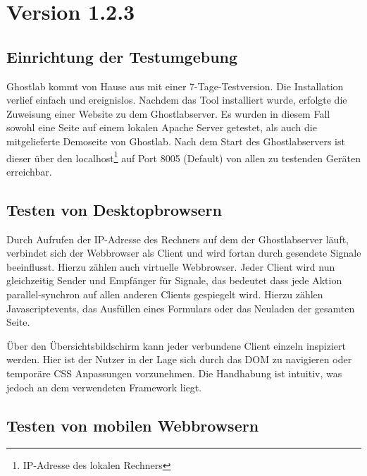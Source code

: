 	\section{ Version 1.2.3}
		\subsection {Einrichtung der Testumgebung}
		Ghostlab kommt von Hause aus mit einer 7-Tage-Testversion. Die Installation verlief einfach und ereignislos. Nachdem das Tool installiert wurde, erfolgte die Zuweisung einer Website zu dem Ghostlabserver. Es wurden in diesem Fall sowohl eine Seite auf einem lokalen \Gls{Apache} Server getestet, als auch die mitgelieferte Demoseite von Ghostlab. Nach dem Start des Ghostlabservers ist dieser über den localhost\footnote{IP-Adresse des lokalen Rechners} auf Port 8005 (Default) von allen zu testenden Geräten erreichbar.
		
		\subsection{Testen von Desktopbrowsern}
		Durch Aufrufen der IP-Adresse des Rechners auf dem der Ghostlabserver läuft, verbindet sich der \Gls{Webbrowser} als Client und wird fortan durch gesendete Signale beeinflusst. Hierzu zählen auch virtuelle \Gls{Webbrowser}. Jeder Client wird nun gleichzeitig Sender und Empfänger für Signale, das bedeutet dass jede Aktion \Gls{parallel-synchron} auf allen anderen Clients gespiegelt wird. Hierzu zählen \Gls{Javascript}events, das Ausfüllen eines Formulars oder das Neuladen der gesamten Seite.
		
		Über den Übersichtsbildschirm kann jeder verbundene Client einzeln inspiziert werden. Hier ist der Nutzer in der Lage sich durch das \Gls{DOM} zu navigieren oder temporäre CSS Anpassungen vorzunehmen. Die Handhabung ist intuitiv, was jedoch an dem verwendeten \Gls{Framework}  liegt.
		
		\pagebreak
		\subsection{Testen von mobilen \Gls{Webbrowser}n}
		
